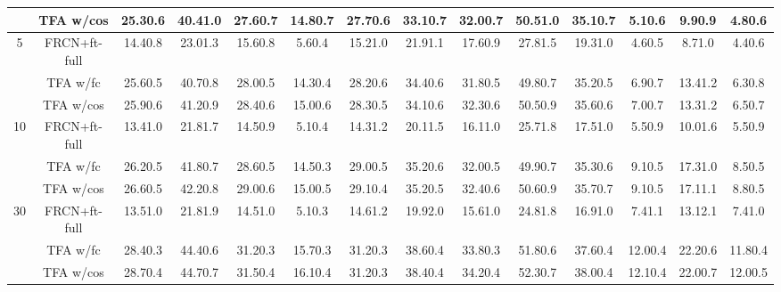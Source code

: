\documentclass{article}
\newcommand{\model}{TFA\xspace}
\begin{document}
\begin{table*}[ht]
{\begin{tabular}{c|c|cccccc|ccc|ccc}
 & {\cellcolor{Gray} \model w/cos} & \cellcolor{Gray}25.30.6 & \cellcolor{Gray}40.41.0 & \cellcolor{Gray}27.60.7 & \cellcolor{Gray}14.80.7 & \cellcolor{Gray}27.70.6 & \cellcolor{Gray}33.10.7 & \cellcolor{Gray}32.00.7 & \cellcolor{Gray}50.51.0 & \cellcolor{Gray}35.10.7 & \cellcolor{Gray}5.10.6 & \cellcolor{Gray}9.90.9 & \cellcolor{Gray}4.80.6 \\ \midrule
\multirow{3}{*}{5} & FRCN+ft-full & 14.40.8 & 23.01.3 & 15.60.8 & 5.60.4 & 15.21.0 & 21.91.1 & 17.60.9 & 27.81.5 & 19.31.0 & 4.60.5 & 8.71.0 & 4.40.6 \\
 & {\model w/fc} & 25.60.5 & 40.70.8 & 28.00.5 & 14.30.4 & 28.20.6 & 34.40.6 & 31.80.5 & 49.80.7 & 35.20.5 & 6.90.7 & 13.41.2 & 6.30.8 \\
 & {\cellcolor{Gray} \model w/cos} & \cellcolor{Gray}25.90.6 & \cellcolor{Gray}41.20.9 & \cellcolor{Gray}28.40.6 & \cellcolor{Gray}15.00.6 & \cellcolor{Gray}28.30.5 & \cellcolor{Gray}34.10.6 & \cellcolor{Gray}32.30.6 & \cellcolor{Gray}50.50.9 & \cellcolor{Gray}35.60.6 & \cellcolor{Gray}7.00.7 & \cellcolor{Gray}13.31.2 & \cellcolor{Gray}6.50.7 \\ \midrule
\multirow{3}{*}{10} & FRCN+ft-full & 13.41.0 & 21.81.7 & 14.50.9 & 5.10.4 & 14.31.2 & 20.11.5 & 16.11.0 & 25.71.8 & 17.51.0 & 5.50.9 & 10.01.6 & 5.50.9 \\
 & {\model w/fc} & 26.20.5 & 41.80.7 & 28.60.5 & 14.50.3 & 29.00.5 & 35.20.6 & 32.00.5 & 49.90.7 & 35.30.6 & 9.10.5 & 17.31.0 & 8.50.5 \\
 & {\cellcolor{Gray} \model w/cos} & \cellcolor{Gray}26.60.5 & \cellcolor{Gray}42.20.8 & \cellcolor{Gray}29.00.6 & \cellcolor{Gray}15.00.5 & \cellcolor{Gray}29.10.4 & \cellcolor{Gray}35.20.5 & \cellcolor{Gray}32.40.6 & \cellcolor{Gray}50.60.9 & \cellcolor{Gray}35.70.7 & \cellcolor{Gray}9.10.5 & \cellcolor{Gray}17.11.1 & \cellcolor{Gray}8.80.5 \\ \midrule
\multirow{3}{*}{30} & FRCN+ft-full & 13.51.0 & 21.81.9 & 14.51.0 & 5.10.3 & 14.61.2 & 19.92.0 & 15.61.0 & 24.81.8 & 16.91.0 & 7.41.1 & 13.12.1 & 7.41.0 \\
 & {\model w/fc} & 28.40.3 & 44.40.6 & 31.20.3 & 15.70.3 & 31.20.3 & 38.60.4 & 33.80.3 & 51.80.6 & 37.60.4 & 12.00.4 & 22.20.6 & 11.80.4 \\
 & {\cellcolor{Gray} \model w/cos} & \cellcolor{Gray}28.70.4 & \cellcolor{Gray}44.70.7 & \cellcolor{Gray}31.50.4 & \cellcolor{Gray}16.10.4 & \cellcolor{Gray}31.20.3 & \cellcolor{Gray}38.40.4 & \cellcolor{Gray}34.20.4 & \cellcolor{Gray}52.30.7 & \cellcolor{Gray}38.00.4 & \cellcolor{Gray}12.10.4 & \cellcolor{Gray}22.00.7 & \cellcolor{Gray}12.00.5 \\
\bottomrule
\end{tabular}}
\vspace{-1mm}
\label{tab:coco_bench}
\end{table*}
\end{document}
